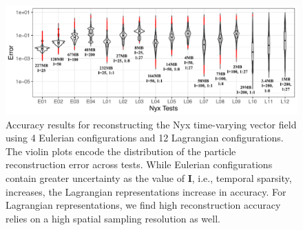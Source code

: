 \begin{figure}[!t]
\centering
\includegraphics[width=\linewidth]{Images/nyx_violinplot.pdf}
\vspace{-5mm}
\caption{Accuracy results for reconstructing the Nyx time-varying vector field using 4 Eulerian configurations and 12 Lagrangian configurations. The violin plots encode the distribution of the particle reconstruction error across tests. While Eulerian configurations contain greater uncertainty as the value of \textbf{I}, i.e., temporal sparsity, increases, the Lagrangian representations increase in accuracy. For Lagrangian representations, we find high reconstruction accuracy relies on a high spatial sampling resolution as well.}
\vspace{-5mm}
\label{fig:nyx_violinplot}
\end{figure}
